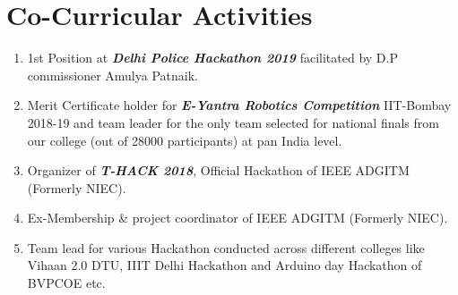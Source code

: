 \documentclass[10pt]{report}
\begin{document}
\section*{\color{BlueViolet}\faTrophy\hspace{1pt} Co-Curricular Activities}%
\begin{enumerate}
	\item 1st Position at \textbf{\emph{Delhi Police Hackathon 2019}}  facilitated by D.P commissioner Amulya Patnaik.
	\item Merit Certificate holder for \textbf{\emph{E-Yantra Robotics Competition}} IIT-Bombay 2018-19 and team leader for the only team selected for national finals from our college (out of 28000 participants) at pan India level.
	\item Organizer of \textbf{\emph{T-HACK 2018}}, Official Hackathon of IEEE ADGITM (Formerly NIEC).
	\item Ex-Membership \& project coordinator of IEEE ADGITM (Formerly NIEC).
	\item Team lead for various Hackathon conducted across different colleges like Vihaan 2.0 DTU, IIIT Delhi Hackathon and Arduino day Hackathon of BVPCOE etc.
\end{enumerate}

\end{document}
